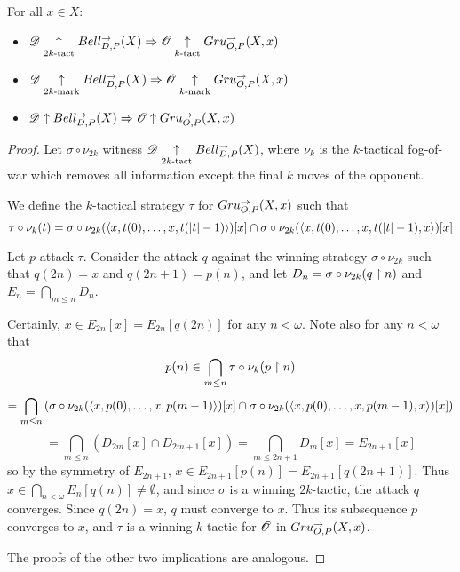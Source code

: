 \begin{thm}
For all $x\in X$:
  \begin{itemize}
    \item
      $\mathscr{D}\underset{2k\text{-tact}}{\uparrow} Bell_{D,P}^{\to}(X) \Rightarrow \mathscr{O} \underset{k\text{-tact}}{\uparrow} Gru_{O,P}^{\to}(X,x)$
    \item
      $\mathscr{D}\underset{2k\text{-mark}}{\uparrow} Bell_{D,P}^{\to}(X) \Rightarrow \mathscr{O} \underset{k\text{-mark}}{\uparrow} Gru_{O,P}^{\to}(X,x)$
    \item
      $\mathscr{D}\uparrow Bell_{D,P}^{\to}(X) \Rightarrow \mathscr{O} \uparrow Gru_{O,P}^{\to}(X,x)$
  \end{itemize}
\end{thm}

\begin{proof}
Let $\sigma\circ \nu_{2k}$ witness $\mathscr{D} \underset{2k\text{-tact}}{\uparrow} Bell_{D,P}^{\to}(X)$,
where $\nu_k$ is the $k$-tactical fog-of-war which removes all information
except the final $k$ moves of the opponent.

We define the $k$-tactical strategy $\tau$ for $Gru_{O,P}^{\to}(X,x)$ such that
  \[
    \tau\circ \nu_k(t)
      =
    \sigma\circ \nu_{2k}(\langle x,t(0),\dots,x,t(|t|-1)\rangle)[x]
      \cap
    \sigma\circ \nu_{2k}(\langle x,t(0),\dots,x,t(|t|-1),x\rangle)[x]
  \]

Let $p$ attack $\tau$. Consider the attack $q$ against the winning strategy
$\sigma\circ \nu_{2k}$ such that $q(2n)=x$ and $q(2n+1)=p(n)$, and let
$D_n=\sigma\circ \nu_{2k}(q\restriction n)$ and $E_n=\bigcap_{m\leq n}D_n$.

Certainly, $x\in E_{2n}[x]= E_{2n}[q(2n)]$ for any $n<\omega$.
Note also for any $n<\omega$ that
    \[
      p(n) \in
      \bigcap_{m\leq n}\tau\circ \nu_k(p\restriction n)
    \]
    \[
      =
      \bigcap_{m\leq n}\left(
        \sigma\circ \nu_{2k}(\langle x,p(0),\dots,x,p(m-1)\rangle)[x]\cap
        \sigma\circ \nu_{2k}(\langle x,p(0),\dots,x,p(m-1),x\rangle)[x]
      \right)
    \]
    \[
      =
      \bigcap_{m\leq n}\left(
        D_{2m}[x]\cap
        D_{2m+1}[x]
      \right) =
      \bigcap_{m\leq 2n+1} D_m[x]=E_{2n+1}[x]
    \]
so by the symmetry of $E_{2n+1}$, $x\in E_{2n+1}[p(n)]= E_{2n+1}[q(2n+1)]$.
Thus $x\in \bigcap_{n<\omega} E_n[q(n)]\not=\emptyset$, and since $\sigma$ is
a winning $2k$-tactic, the attack $q$ converges. Since $q(2n)=x$, $q$ must
converge to $x$. Thus its subsequence $p$ converges to $x$, and $\tau$ is a
winning $k$-tactic for $\mathscr{O}$ in $Gru_{O,P}^{\to}(X,x)$.

The proofs of the other two implications are analogous.
\end{proof}

